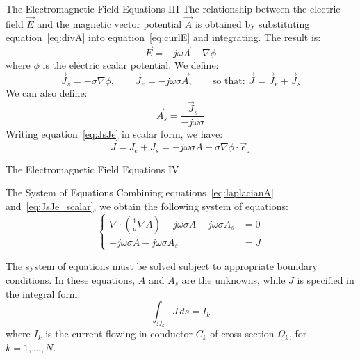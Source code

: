 \documentclass[aspectratio=54,xcolor=dvipsnames]{beamer}
\begin{document}
\begin{frame}{The Electromagnetic Field Equations III}
    The relationship between the electric field $\vec{E}$ and the magnetic vector potential $\vec{A}$ is obtained by substituting equation~\eqref{eq:divA} into equation~\eqref{eq:curlE} and integrating. The result is:
    \begin{equation}
        \vec{E} = -j\omega \vec{A} - \nabla \phi \label{eq:E}
    \end{equation}
    where $\phi$ is the electric scalar potential.
    \newline
    We define:
    \begin{equation}
        \vec{J}_s = - \sigma \nabla \phi, \qquad
        \vec{J}_e = - j \omega \sigma \vec{A},  \qquad 
        \text{so that: } \vec{J} = \vec{J}_e + \vec{J}_s \label{eq:JsJe}
    \end{equation}
    We can also define:
    \begin{equation}
        \vec{A}_s =  \frac{\vec{J}_s}{- j \omega \sigma}
    \end{equation}
    Writing equation~\eqref{eq:JsJe} in scalar form, we have: 
    \begin{equation}
        J = J_e + J_s = - j \omega \sigma A - \sigma \nabla \phi \cdot \vec{e}_z \label{eq:JsJe_scalar}
    \end{equation}
\end{frame}

\begin{frame}{The Electromagnetic Field Equations IV}
    \begin{block}{The System of Equations}
    Combining equations~\eqref{eq:laplacianA} and~\eqref{eq:JsJe_scalar}, we obtain the following system of equations:
    \begin{equation}\label{eq:system_equations}
        \left\{
        \begin{aligned}
            \nabla \cdot \left( \frac{1}{\mu} \nabla A \right) - j\omega \sigma A - j\omega \sigma A_s &= 0 
            \\[1em]
            - j\omega \sigma A - j\omega \sigma A_s &= J 
        \end{aligned}
        \right.
    \end{equation}
    \end{block}
    The system of equations must be solved subject to appropriate boundary conditions. In these equations, $A$ and $A_s$ are the unknowns, while $J$ is specified in the integral form:
    \begin{equation}
        \int_{\Omega_k} J \, ds = I_k
        \label{eq:current_constraint}
    \end{equation}
    where $I_k$ is the current flowing in conductor $C_k$ of cross-section $\Omega_k$, for $k = 1, \ldots, N$.
\end{frame}
\end{document}
